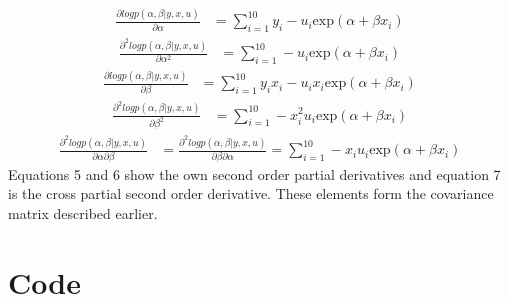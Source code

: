 \documentclass{article}
\begin{document}
\begin{align*}
\frac{\partial logp(\alpha, \beta | y, x, u)}{\partial \alpha} &= \sum_{i=1}^{10} y_i - u_i \text{exp}(\alpha + \beta x_i)
\end{align*}
\begin{align}
\frac{\partial^2 logp(\alpha, \beta | y, x, u)}{\partial \alpha^2} &=\sum_{i=1}^{10} - u_i \text{exp}(\alpha + \beta x_i)
\end{align}
\begin{align*}
\frac{\partial logp(\alpha, \beta | y, x, u)}{\partial \beta} &= \sum_{i=1}^{10}y_ix_i - u_ix_i\text{exp}(\alpha + \beta x_i)
\end{align*}
\begin{align}
\frac{\partial^2 logp(\alpha, \beta | y, x, u)}{\partial \beta^2} &= \sum_{i=1}^{10} - x_i^2 u_i \text{exp}(\alpha + \beta x_i)
\end{align}
\begin{align}
\frac{\partial^2 logp(\alpha, \beta | y, x, u)}{\partial \alpha \partial \beta} &= \frac{\partial^2 logp(\alpha, \beta | y, x, u)}{\partial \beta \partial \alpha} = \sum_{i=1}^{10} -x_i u_i\text{exp}(\alpha + \beta x_i)
\end{align}
Equations 5 and 6 show the own second order partial derivatives and equation 7 is the cross partial second order derivative. These elements form the covariance matrix described earlier.

\section{Code}
\end{document}
